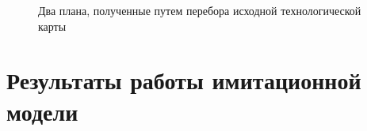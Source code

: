 \begin{figure}[H]
    \caption{Два плана, полученные путем перебора исходной технологической карты}
    \label{ris:Force}
\end{figure}

\section{Результаты работы имитационной модели}
